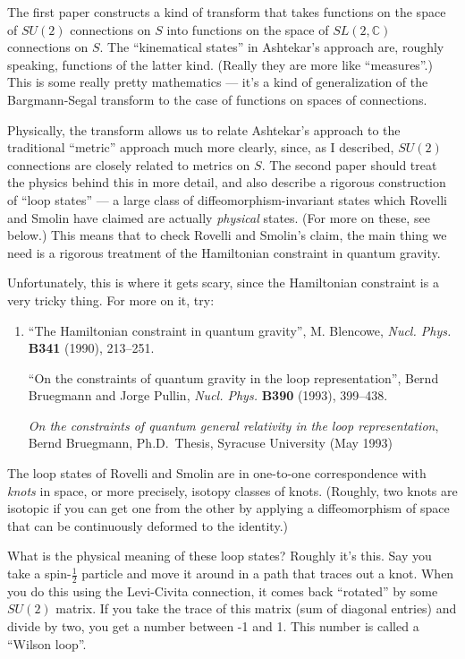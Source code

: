 \documentclass{article}
\begin{document}
The first paper constructs a kind of transform that takes functions on
the space of \(SU(2)\) connections on \(S\) into functions on the space
of \(SL(2,\mathbb{C})\) connections on \(S\). The ``kinematical states''
in Ashtekar's approach are, roughly speaking, functions of the latter
kind. (Really they are more like ``measures''.) This is some really
pretty mathematics --- it's a kind of generalization of the
Bargmann-Segal transform to the case of functions on spaces of
connections.

Physically, the transform allows us to relate Ashtekar's approach to the
traditional ``metric'' approach much more clearly, since, as I
described, \(SU(2)\) connections are closely related to metrics on
\(S\). The second paper should treat the physics behind this in more
detail, and also describe a rigorous construction of ``loop states'' ---
a large class of diffeomorphism-invariant states which Rovelli and
Smolin have claimed are actually \emph{physical} states. (For more on
these, see below.) This means that to check Rovelli and Smolin's claim,
the main thing we need is a rigorous treatment of the Hamiltonian
constraint in quantum gravity.

Unfortunately, this is where it gets scary, since the Hamiltonian
constraint is a very tricky thing. For more on it, try:

\begin{enumerate}
\def\labelenumi{\arabic{enumi})}
\setcounter{enumi}{2}
\item
  ``The Hamiltonian constraint in quantum gravity'', M. Blencowe,
  \emph{Nucl. Phys.} \textbf{B341} (1990), 213--251.

  ``On the constraints of quantum gravity in the loop representation'',
  Bernd Bruegmann and Jorge Pullin, \emph{Nucl. Phys.} \textbf{B390}
  (1993), 399--438.

  \emph{On the constraints of quantum general relativity in the loop
  representation}, Bernd Bruegmann, Ph.D.~Thesis, Syracuse University
  (May 1993)
\end{enumerate}

The loop states of Rovelli and Smolin are in one-to-one correspondence
with \emph{knots} in space, or more precisely, isotopy classes of knots.
(Roughly, two knots are isotopic if you can get one from the other by
applying a diffeomorphism of space that can be continuously deformed to
the identity.)

What is the physical meaning of these loop states? Roughly it's this.
Say you take a spin-\(\frac12\) particle and move it around in a path
that traces out a knot. When you do this using the Levi-Civita
connection, it comes back ``rotated'' by some \(SU(2)\) matrix. If you
take the trace of this matrix (sum of diagonal entries) and divide by
two, you get a number between -1 and 1. This number is called a ``Wilson
loop''.
\end{document}

